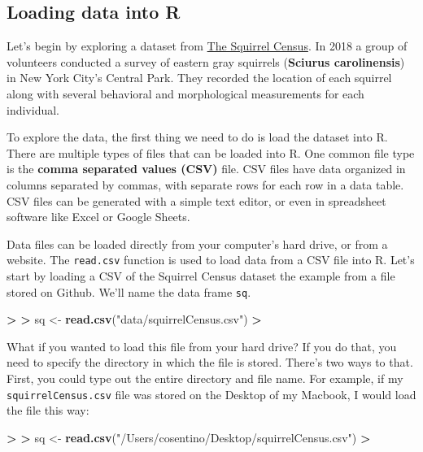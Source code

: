 \documentclass[
]{book}
\newenvironment{Shaded}{\begin{snugshade}}{\end{snugshade}}
\newcommand{\ErrorTok}[1]{\textcolor[rgb]{0.64,0.00,0.00}{\textbf{#1}}}
\newcommand{\FunctionTok}[1]{\textcolor[rgb]{0.13,0.29,0.53}{\textbf{#1}}}
\newcommand{\NormalTok}[1]{#1}
\newcommand{\OtherTok}[1]{\textcolor[rgb]{0.56,0.35,0.01}{#1}}
\newcommand{\SpecialCharTok}[1]{\textcolor[rgb]{0.81,0.36,0.00}{\textbf{#1}}}
\newcommand{\StringTok}[1]{\textcolor[rgb]{0.31,0.60,0.02}{#1}}
\begin{document}
\subsection{Loading data into R}\label{loading-data-into-r}

Let's begin by exploring a dataset from \href{https://www.thesquirrelcensus.com/}{The Squirrel Census}. In 2018 a group of volunteers conducted a survey of eastern gray squirrels (\textbf{Sciurus carolinensis}) in New York City's Central Park. They recorded the location of each squirrel along with several behavioral and morphological measurements for each individual.

To explore the data, the first thing we need to do is load the dataset into R. There are multiple types of files that can be loaded into R. One common file type is the \textbf{comma separated values (CSV)} file. CSV files have data organized in columns separated by commas, with separate rows for each row in a data table. CSV files can be generated with a simple text editor, or even in spreadsheet software like Excel or Google Sheets.

Data files can be loaded directly from your computer's hard drive, or from a website. The \texttt{read.csv} function is used to load data from a CSV file into R. Let's start by loading a CSV of the Squirrel Census dataset the example from a file stored on Github. We'll name the data frame \texttt{sq}.

\begin{Shaded}
\begin{Highlighting}[]
\SpecialCharTok{\textgreater{}} 
\ErrorTok{\textgreater{}}\NormalTok{ sq }\OtherTok{\textless{}{-}} \FunctionTok{read.csv}\NormalTok{(}\StringTok{"data/squirrelCensus.csv"}\NormalTok{)}
\SpecialCharTok{\textgreater{}} 
\end{Highlighting}
\end{Shaded}

What if you wanted to load this file from your hard drive? If you do that, you need to specify the directory in which the file is stored. There's two ways to that. First, you could type out the entire directory and file name. For example, if my \texttt{squirrelCensus.csv} file was stored on the Desktop of my Macbook, I would load the file this way:

\begin{Shaded}
\begin{Highlighting}[]
\SpecialCharTok{\textgreater{}} 
\ErrorTok{\textgreater{}}\NormalTok{ sq }\OtherTok{\textless{}{-}} \FunctionTok{read.csv}\NormalTok{(}\StringTok{"/Users/cosentino/Desktop/squirrelCensus.csv"}\NormalTok{)}
\SpecialCharTok{\textgreater{}} 
\end{Highlighting}
\end{Shaded}
\end{document}
